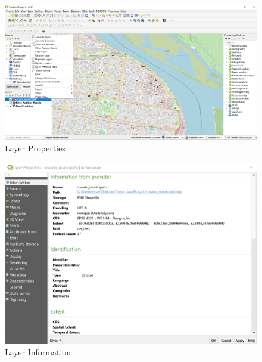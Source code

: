 \documentclass[
]{book}
\begin{document}
\begin{figure}

{\centering \includegraphics[width=1\linewidth]{images/properties} 

}

\caption{Layer Properties}\label{fig:img-12}
\end{figure}
\begin{figure}

{\centering \includegraphics[width=1\linewidth]{images/crs} 

}

\caption{Layer Information}\label{fig:img-121}
\end{figure}
\end{document}
